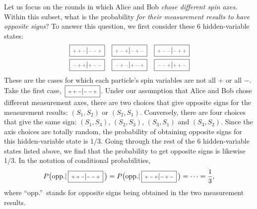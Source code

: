 \documentclass[pra,12pt]{revtex4-2}
\def\hvbox[#1]#2{\,\boxed{\scalebox{0.7}{$\,#1$}|\scalebox{0.7}{$#2\,$}}}
\begin{document}
Let us focus on the rounds in which Alice and Bob \textit{chose
  different spin axes}.  Within this subset, what is the probability
\textit{for their measurement results to have opposite signs}?  To
answer this question, we first consider these 6 hidden-variable
states:
\begin{align*}
  \begin{aligned}
    \hvbox[++-]{--+} \;\;\;
    \hvbox[+-+]{-+-} \;\;\;
    \hvbox[+--]{-++}\\
    \hvbox[-++]{+--} \;\;\;
    \hvbox[-+-]{+-+} \;\;\;
    \hvbox[--+]{++-}
  \end{aligned}
\end{align*}
These are the cases for which each particle's spin variables are not
all $+$ or all $-$.  Take the first case, $\hvbox[++-]{--+}$.  Under
our assumption that Alice and Bob chose different measurement axes,
there are two choices that give opposite signs for the measurement
results: $(S_1,S_2)$ or $(S_2,S_1)$.  Conversely, there are four
choices that give the same sign: $(S_1,S_3)$, $(S_2,S_3)$, $(S_3,S_1)$
and $(S_3, S_2)$.  Since the axis choices are totally random, the
probability of obtaining opposite signs for this hidden-variable state
is 1/3.  Going through the rest of the 6 hidden-variable states listed
above, we find that the probability to get opposite signs is likewise
1/3.  In the notation of conditional probabilities,
\begin{equation}
  P\big(\textrm{opp.} | \hvbox[++-]{--+}\,\big) =
  P\big(\textrm{opp.} | \hvbox[+-+]{-+-}\,\big) = \cdots = \frac{1}{3},
  \label{bell1}
\end{equation}
where ``opp.''~stands for opposite signs being obtained in the two
measurement results.
\end{document}
